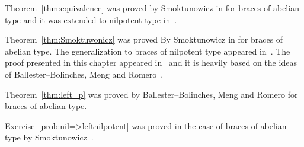 Theorem~\ref{thm:equivalence} was proved by Smoktunowicz in \cite{MR3814340} for braces of abelian type and it was extended 
to nilpotent type in~\cite{MR3957824}. 

Theorem~\ref{thm:Smoktuwonicz} was proved By Smoktunowicz in \cite[Theorem 1.1]{MR3814340} for braces of abelian type. 
The generalization to braces of nilpotent type appeared in~\cite[Theorem 4.8]{MR3957824}. The proof 
presented in this chapter appeared in~\cite{MR4062375} and it is 
heavily based on the ideas of Ballester--Bolinches, Meng and Romero~\cite{MR3935814}.

Theorem~\ref{thm:left_p} was proved by Ballester--Bolinches, Meng and Romero for braces of abelian type.

Exercise~\ref{prob:nil=>leftnilpotent} was proved in the case of braces of abelian type by Smoktunowicz~\cite{MR3765444}.